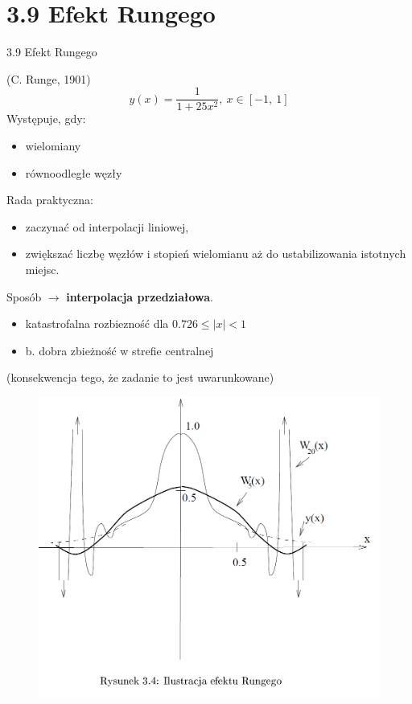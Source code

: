 \section{3.9 Efekt Rungego}
\begin{frame}
{3.9 Efekt Rungego}

(C. Runge, 1901)
$$
y(x)=\frac{1}{1+25x^{2}},\ x\in[-1,\ 1]
$$
Występuje, gdy:
\begin{itemize}
\item wielomiany

\item równoodległe węzły
\end{itemize}

Rada praktyczna:

\begin{itemize}
\item zaczynać od interpolacji liniowej,

\item zwiększać liczbę węzłów i stopień wielomianu aż do ustabilizowania istotnych miejsc.
\end{itemize}


Sposób $\rightarrow$ \textbf{interpolacja przedziałowa}.
\begin{itemize}
\item katastrofalna rozbiezność dla $0.726\leq|x|<1$

\item b. dobra zbieżność w strefie centralnej
\end{itemize}

(konsekwencja tego, że zadanie to jest { uwarunkowane})
\end{frame}
\begin{frame}
\begin{figure}[h]
			\includegraphics[scale=0.35]{img/3/interpol_3_9}
	\end{figure}
\end{frame}